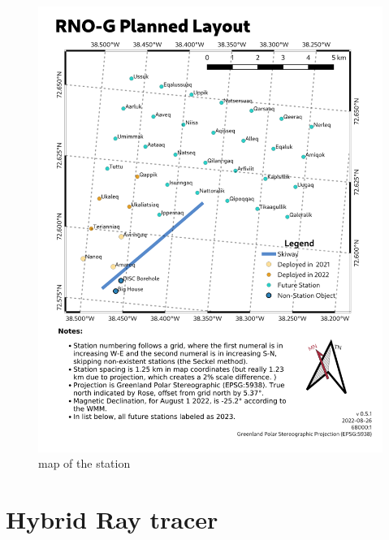 \documentclass[11pt,a4paper,faculty=we,language=en,doctype=report]{cls/ugent-doc}
\begin{document}
\begin{figure}
	\includegraphics[width=\textwidth]{figures/station-map.png}	
	\caption{map of the station}
	\label{fig:station map}
\end{figure}

\chapter{Hybrid Ray tracer}
\label{chapter:hybrid}
\end{document}

